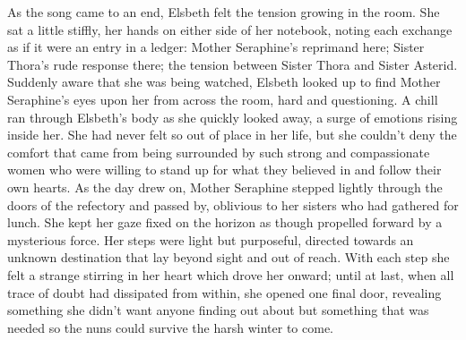 \documentclass[11pt]{article}
\begin{document}
As the song came to an end, Elsbeth felt the tension growing in the room. She sat a little stiffly, her hands on either side of her notebook, noting each exchange as if it were an entry in a ledger: Mother Seraphine's reprimand here; Sister Thora's rude response there; the tension between Sister Thora and Sister Asterid. Suddenly aware that she was being watched, Elsbeth looked up to find Mother Seraphine's eyes upon her from across the room, hard and questioning. A chill ran through Elsbeth's body as she quickly looked away, a surge of emotions rising inside her. She had never felt so out of place in her life, but she couldn't deny the comfort that came from being surrounded by such strong and compassionate women who were willing to stand up for what they believed in and follow their own hearts.
As the day drew on, Mother Seraphine stepped lightly through the doors of the refectory and passed by, oblivious to her sisters who had gathered for lunch. She kept her gaze fixed on the horizon as though propelled forward by a mysterious force. Her steps were light but purposeful, directed towards an unknown destination that lay beyond sight and out of reach. With each step she felt a strange stirring in her heart which drove her onward; until at last, when all trace of doubt had dissipated from within, she opened one final door, revealing something she didn't want anyone finding out about but something that was needed so the nuns could survive the harsh winter to come.
\end{document}
